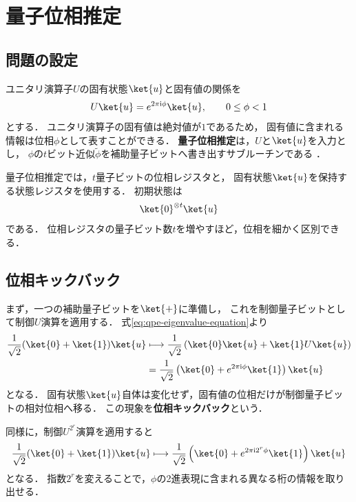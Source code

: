 \section{量子位相推定}
\label{sec:quantum-phase-estimation}

\subsection{問題の設定}
\label{subsec:qpe-problem-setting}

ユニタリ演算子$U$の固有状態$\ket{u}$と固有値の関係を
\begin{equation}
  U\ket{u}
  =
  e^{2\pi\mathrm{i}\phi}\ket{u},
  \qquad
  0\leq\phi<1
  \label{eq:qpe-eigenvalue-equation}
\end{equation}
とする．
ユニタリ演算子の固有値は絶対値が$1$であるため，
固有値に含まれる情報は位相$\phi$として表すことができる．
\textbf{量子位相推定}は，$U$と$\ket{u}$を入力とし，
$\phi$の$t$ビット近似$\widetilde{\phi}$を補助量子ビットへ書き出すサブルーチンである
\cite{shimada2020}．

量子位相推定では，$t$量子ビットの位相レジスタと，
固有状態$\ket{u}$を保持する状態レジスタを使用する．
初期状態は
\begin{align*}
  \ket{0}^{\otimes t}\ket{u}
\end{align*}
である．
位相レジスタの量子ビット数$t$を増やすほど，位相を細かく区別できる．

\subsection{位相キックバック}
\label{subsec:qpe-phase-kickback}

まず，一つの補助量子ビットを$\ket{+}$に準備し，
これを制御量子ビットとして制御$U$演算を適用する．
式\eqref{eq:qpe-eigenvalue-equation}より
\begin{align}
  \frac{1}{\sqrt{2}}
  (\ket{0}+\ket{1})\ket{u}
  &\longmapsto
  \frac{1}{\sqrt{2}}
  \left(
    \ket{0}\ket{u}
    +\ket{1}U\ket{u}
  \right)\notag\\
  &=
  \frac{1}{\sqrt{2}}
  \left(
    \ket{0}
    +e^{2\pi\mathrm{i}\phi}\ket{1}
  \right)\ket{u}
  \label{eq:single-qubit-phase-kickback}
\end{align}
となる．
固有状態$\ket{u}$自体は変化せず，固有値の位相だけが制御量子ビットの相対位相へ移る．
この現象を\textbf{位相キックバック}という．

同様に，制御$U^{2^r}$演算を適用すると
\begin{align*}
  \frac{1}{\sqrt{2}}(\ket{0}+\ket{1})\ket{u}
  \longmapsto
  \frac{1}{\sqrt{2}}
  \left(
    \ket{0}+e^{2\pi\mathrm{i}2^r\phi}\ket{1}
  \right)\ket{u}
\end{align*}
となる．
指数$2^r$を変えることで，$\phi$の2進表現に含まれる異なる桁の情報を取り出せる．

